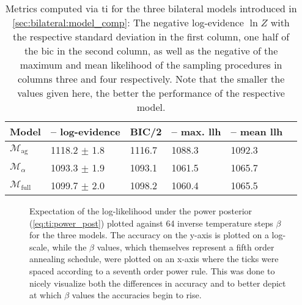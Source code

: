 \documentclass[\relativeRoot/main.tex]{subfiles}
\begin{document}
\begin{table}
    \centering
    \begin{tabular}{|l|l|l|l|l|l|}
        \hline
        \textbf{Model} & \textbf{-- log-evidence} & \textbf{BIC/2} & \textbf{-- max. llh} & \textbf{-- mean llh} \\
        \hline
        $\mathcal{M}_\text{ag}$ & 1118.2 $\pm$ 1.8 & 1116.7 & 1088.3 & 1092.3 \\
        $\mathcal{M}_\alpha$ & 1093.3 $\pm$ 1.9 & 1093.1 & 1061.5 & 1065.7 \\
        $\mathcal{M}_\text{full}$ & 1099.7 $\pm$ 2.0 & 1098.2 & 1060.4 & 1065.5 \\
        \hline
    \end{tabular}
    \caption[
        Metrics for assessing three bilateral models
    ]{
        Metrics computed via \gls{ti} for the three bilateral models introduced in \cref{sec:bilateral:model_comp}: The negative log-evidence $\ln{Z}$ with the respective standard deviation in the first column, one half of the \gls{bic} in the second column, as well as the negative of the maximum and mean likelihood of the sampling procedures in columns three and four respectively. Note that the smaller the values given here, the better the performance of the respective model.
    }
    \label{table:bilateral:model_comp:evidences}
\end{table}

\begin{figure}
    \centering
    
    \caption[Plotted accuracy over the course of a thermodynamic integration round]{
        Expectation of the log-likelihood under the power posterior (\cref{eq:ti:power_post}) plotted against 64 inverse temperature steps $\beta$ for the three models. The accuracy on the y-axis is plotted on a log-scale, while the $\beta$ values, which themselves represent a fifth order annealing schedule, were plotted on an x-axis where the ticks were spaced according to a seventh order power rule. This was done to nicely visualize both the differences in accuracy and to better depict at which $\beta$ values the accuracies begin to rise.
    }
    \label{fig:bilateral:model_comp:thermo_int}
\end{figure}
\end{document}
